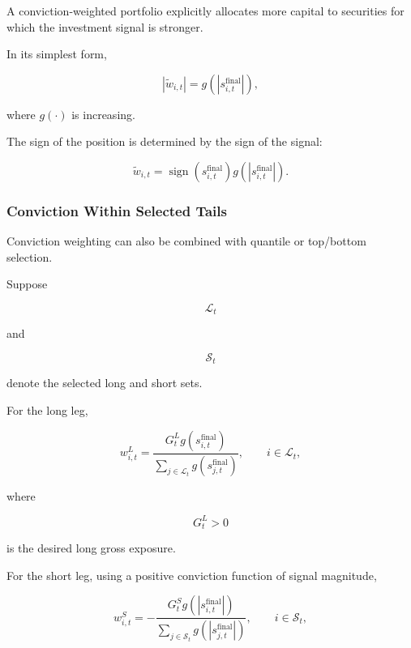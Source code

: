 \documentclass[11pt,a4paper]{article}
\begin{document}
A conviction-weighted portfolio explicitly allocates more capital to securities
for which the investment signal is stronger.

In its simplest form,

\begin{equation}
\boxed{
|\widetilde{w}_{i,t}|
=
g
\left(
|s_{i,t}^{\mathrm{final}}|
\right),
}
\end{equation}

where $g(\cdot)$ is increasing.

The sign of the position is determined by the sign of the signal:

\begin{equation}
\boxed{
\widetilde{w}_{i,t}
=
\operatorname{sign}
\left(
s_{i,t}^{\mathrm{final}}
\right)
g
\left(
|s_{i,t}^{\mathrm{final}}|
\right).
}
\end{equation}


\subsubsection{Conviction Within Selected Tails}

Conviction weighting can also be combined with quantile or top/bottom
selection.

Suppose

\begin{equation}
\mathcal{L}_t
\end{equation}

and

\begin{equation}
\mathcal{S}_t
\end{equation}

denote the selected long and short sets.

For the long leg,

\begin{equation}
\boxed{
w_{i,t}^{L}
=
\frac{G_t^{L}
g(s_{i,t}^{\mathrm{final}})}
{
\sum_{j\in\mathcal{L}_t}
g(s_{j,t}^{\mathrm{final}})
},
\qquad
i\in\mathcal{L}_t,
}
\end{equation}

where

\begin{equation}
G_t^{L}>0
\end{equation}

is the desired long gross exposure.

For the short leg, using a positive conviction function of signal magnitude,

\begin{equation}
\boxed{
w_{i,t}^{S}
=
-
\frac{
G_t^{S}
g(|s_{i,t}^{\mathrm{final}}|)
}{
\sum_{j\in\mathcal{S}_t}
g(|s_{j,t}^{\mathrm{final}}|)
},
\qquad
i\in\mathcal{S}_t,
}
\end{equation}
\end{document}
